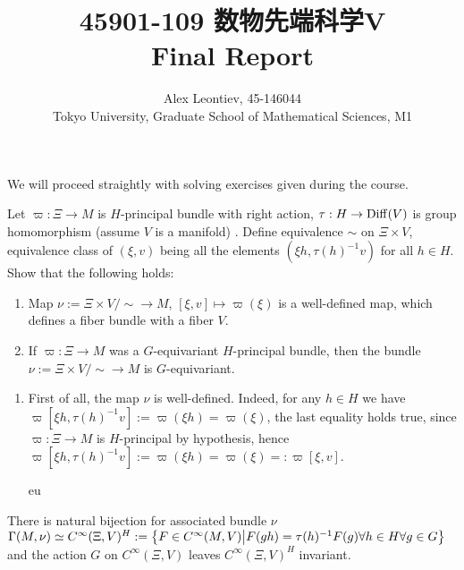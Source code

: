 \documentclass[10pt]{article} %
\title{45901-109 数物先端科学V\\Final Report}
\author{Alex Leontiev, 45-146044
\\Tokyo University, Graduate School of Mathematical Sciences, M1}
\begin{document}
\begin{CJK}{UTF8}{bsmi}
\maketitle
\end{CJK}
We will proceed straightly with solving exercises given during the course.
\begin{myprob} Let $\varpi:\Xi\to M$ is $H$-principal bundle with right action,
	$\tau:H\to\operatorname{Diff}(V)$ is group homomorphism (assume $V$ is a manifold)
	. Define equivalence $\sim$ on $\Xi\times V$, equivalence class of
	$(\xi,v)$ being all the elements $(\xi h,\tau(h)^{-1}v)$ for all $h\in H$.
	Show that the following holds:
	\begin{enumerate}
		\item Map $\nu:=\Xi\times V/\sim\to M$, $[\xi,v]\mapsto\varpi(\xi)$ is a well-defined map,
			which defines a fiber bundle with a fiber $V$.
		\item If $\varpi:\Xi\to M$ was a $G$-equivariant $H$-principal bundle, then the bundle 
			$\nu:=\Xi\times V/\sim\to M$ is $G$-equivariant.
	\end{enumerate}
\end{myprob}
	\begin{enumerate}
		\item First of all, the map $\nu$ is well-defined. Indeed, for any $h\in H$ we have
			$\varpi[\xi h,\tau(h)^{-1}v]:=\varpi(\xi h)=\varpi(\xi)$, the last equality holds
			true, since $\varpi:\Xi\to M$ is $H$-principal by hypothesis, hence
			$\varpi[\xi h,\tau(h)^{-1}v]:=\varpi(\xi h)=\varpi(\xi)=:\varpi[\xi,v]$.

			eu%
	\end{enumerate}
\begin{myprob} There is natural bijection for associated bundle $\nu$ $\Gamma(M,\nu)\simeq
	C^{\infty}(\Xi,V)^H:=\left\{F\in  C^{\infty}(M,V)\big| F(gh)=\tau(h)^{-1}F(g)\forall h\in H\forall g\in G\right\}$
	and the action $G$ on $C^{\infty}(\Xi,V)$ leaves $C^{\infty}(\Xi,V)^H$ invariant.
\end{myprob}%
\end{document}
